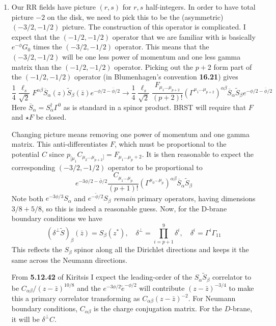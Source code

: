 \documentclass[11pt, class=article, crop=false]{standalone}
\begin{document}
\begin{enumerate}
	\item Our RR fields have picture $(r, s)$ for $r,s$ half-integers. In order to have total picture $-2$ on the disk, we need to pick this to be the (asymmetric) $(-3/2, -1/2)$ picture. The construction of this operator is complicated. I expect that the $(-1/2,-1/2)$ operator that we are familiar with is basically $e^{- \phi} G_0$ times the $(-3/2,-1/2)$ operator. This means that the $(-3/2, -1/2)$ will be one less power of momentum and one less gamma matrix than the $(-1/2, -1/2)$ operator. Picking out the $p+2$ form part of the $(-1/2, -1/2)$ operator (in Blumenhagen's convention \textbf{16.21}) gives
	\[
		\frac14 \frac{\ell_s}{\sqrt 2} 
		F^{\alpha \beta}  \overline{S}_{\alpha}(z) \tilde S_\beta(\bar z) e^{-\phi/2 - \bar \phi/2} 
		\to 
		\frac14 \frac{\ell_s}{\sqrt 2}
		\frac{F_{\mu_1 \dots \mu_{p+2}}}{(p+2)!} (\Gamma^{\mu_1 \dots \mu_{p+2}})^{\alpha \beta} \overline{S}_{\alpha} \tilde S_{\beta} e^{-\phi/2 - \bar \phi/2}
	\]
	Here $\overline S_\alpha = S_\alpha^\dagger \Gamma^0$ as is standard in a spinor product. BRST will require that $F$ and $\star F$ be closed. 
	
	Changing picture means removing one power of momentum and one gamma matrix. This anti-differentiates $F$, which must be proportional to the potential $C$ since $p_{[\mu_1} C_{\mu_2 \dots \mu_{p+2}]} = F_{\mu_1 \dots \mu_p+2}$. It is then reasonable to expect the corresponding $(-3/2, -1/2)$ operator to be proportional to
	\[
		 e^{-3\phi/2 - \bar \phi/2} \frac{C_{\mu_1 \dots \mu_{p}}}{(p+1)!} (\Gamma^{\mu_0 \dots \mu_{p}})^{\alpha \beta} \overline{S}_\alpha \tilde S_\beta
	\]
	Note both $e^{-3\phi/3} S_{\alpha}$ and $e^{-\tilde \phi/2} S_{\beta}$ \emph{remain} primary operators, having dimensions $3/8 + 5/8$, so this is indeed a reasonable guess. Now, for the D-brane boundary conditions we have
	\[
		 (\delta^\perp  \tilde S)_\beta(\bar z) = S_\beta(z^*), \quad \delta^\perp = \prod_{i=p+1}^9 \delta^i, \quad \delta^i = \Gamma^i \Gamma_{11}
	\]
	This reflects the $S_\beta$ spinor along all the Dirichlet directions and keeps it the same across the Neumann directions. 
	
	From \textbf{5.12.42} of Kiritsis  I expect the leading-order of the $S_\alpha \tilde S_\beta$ correlator to be $C_{\alpha \beta}/(z - \bar z)^{10/8}$ and the $e^{-3\phi/2} \tilde e^{-\phi/2}$ will contribute $(z-\bar z)^{-3/4}$ to make this a primary correlator transforming as $C_{\alpha \beta} (z - \bar z)^{-2}$. For Neumann boundary conditions, $C_{\alpha \beta}$ is the charge conjugation matrix. For the $D$-brane, it will be $\delta^\perp C$.
	

\end{enumerate}
\end{document}
